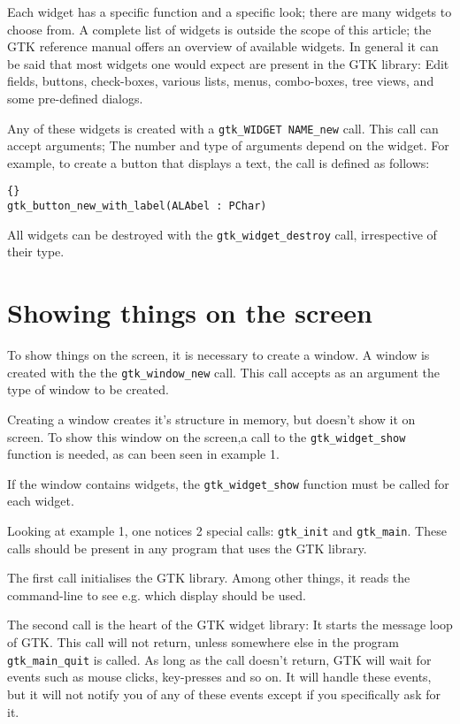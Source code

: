 \documentclass[10pt]{article}
\begin{document}
Each widget has a specific function and a specific look; there are many
widgets to choose from. A complete list of widgets is outside the scope of
this article; the GTK reference manual offers an overview of available
widgets. In general it can be said that most widgets one would expect
are present in the GTK library: Edit fields, buttons, check-boxes, various 
lists, menus, combo-boxes, tree views, and some pre-defined dialogs. 

Any of these widgets is created with a \lstinline|gtk_WIDGET NAME_new| call. 
This call can accept arguments; The number and type of arguments depend 
on the widget. 
For example, to create a button that displays a text, the call is defined 
as follows:
\begin{lstlisting}{}
gtk_button_new_with_label(ALAbel : PChar)
\end{lstlisting}
All widgets can be destroyed with the \lstinline|gtk_widget_destroy| call,
irrespective of their type.

\section{Showing things on the screen}
To show things on the screen, it is necessary to create a window. A window
is created with the the \lstinline|gtk_window_new| call. This call accepts 
as an argument the type of window to be created. 

Creating a window creates it's structure in memory, but doesn't show it on 
screen. To show this window on the screen,a call to the 
\lstinline|gtk_widget_show| function is needed, as can been seen in
example 1.

If the window contains widgets, the \lstinline|gtk_widget_show| function
must be called for each widget. 

Looking at example 1, one notices 2 special calls: \lstinline|gtk_init| and
\lstinline|gtk_main|. These calls should be present in any program that uses
the GTK library.  

The first call initialises the GTK library. Among other things, it reads
the command-line to see e.g. which display should be used.

The second call is the heart of the GTK widget library: It starts the
message loop of GTK. This call will not return, unless somewhere else
in the program \lstinline|gtk_main_quit| is called. As long as the call
doesn't return, GTK will wait for events such as mouse clicks, key-presses
and so on. It will handle these events, but it will not notify you of any 
of these events except if you specifically ask for it. 
\end{document}
